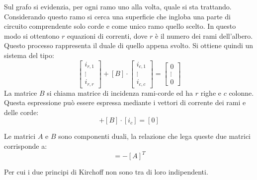 \documentclass{article}
\numberwithin{equation}{subsection}
\begin{document}
Sul grafo si evidenzia, per ogni ramo uno alla volta, quale si sta trattando. Considerando questo ramo si cerca una superficie che ingloba una parte di circuito comprendente 
solo corde e come unico ramo quello scelto. In questo modo si ottentono $r$ equazioni di correnti, dove $r$ è il numero dei rami dell'albero. Questo processo rappresenta il duale 
di quello appena svolto. Si ottiene quindi un sistema del tipo:
\begin{equation*}
    \begin{bmatrix}
        i_{r,1}\\
        \vdots\\
        i_{r,r}
    \end{bmatrix}+[B]\cdot\begin{bmatrix}
        i_{c,1}\\
        \vdots\\
        i_{c,c}
    \end{bmatrix}=\begin{bmatrix}
        0\\
        \vdots\\
        0
    \end{bmatrix}
\end{equation*}
La matrice $B$ si chiama matrice di incidenza rami-corde ed ha $r$ righe e $c$ colonne. Questa espressione può essere espressa mediante i vettori di corrente dei rami e delle 
corde:
\begin{equation*}
    [i_{r}]+[B]\cdot [i_{c}]=[0]
\end{equation*}

Le matrici $A$ e $B$ sono componenti duali, la relazione che lega queste due matrici corrisponde a:
\begin{equation*}
    [B]=-[A]^T
\end{equation*}

Per cui i due principi di Kirchoff non sono tra di loro indipendenti. 
\end{document}
